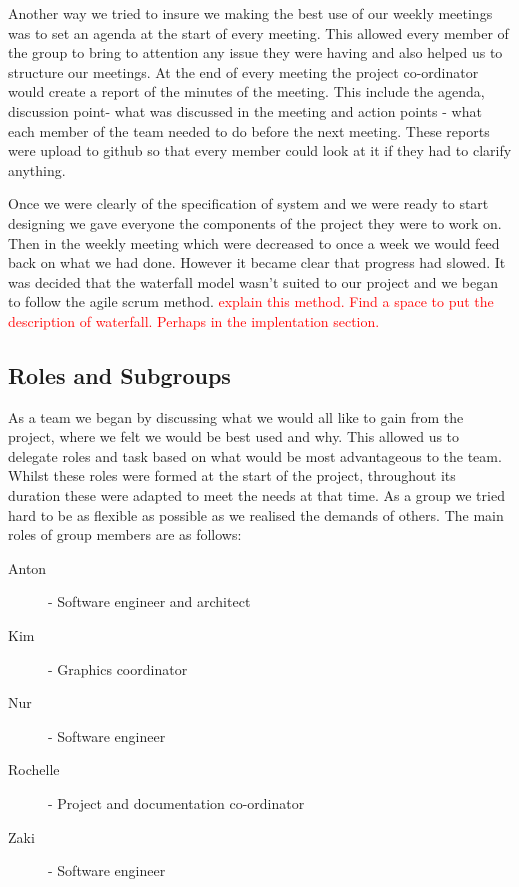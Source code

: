 \documentclass{article}
\begin{document}
 Another way we tried to insure we making the best use of our weekly meetings was to set an agenda at the start of every meeting. This allowed every member of the group to bring to attention any issue they were having and also helped us to structure our meetings. At the end of every meeting the project co-ordinator would create a report of the minutes of the meeting. This include the agenda, discussion point- what was discussed in the meeting and action points - what each member of the team needed to do before the next meeting. These reports were upload to github so that every member could look at it if they had to clarify anything.
 
 Once we were clearly of the specification of system and we were ready to start designing we gave everyone the components of the project they were to work on. Then in the weekly meeting which were decreased to once a week we would feed back on what we had done. However it became clear that progress had slowed. It was decided that the waterfall model wasn't suited to our project and we began to follow the agile scrum method. \textcolor{red}{explain this method. Find a space to put the description of waterfall. Perhaps in the implentation section.}
 
 
	\subsection{Roles and Subgroups}
	
	As a team we began by discussing what we would all like to gain from the project, where we felt we would be best used and why. This allowed us to delegate roles and task based on what would be most advantageous to the team. Whilst these roles were formed at the start of the project, throughout its duration these were adapted to meet the needs at that time. As a group we tried hard to be as flexible as possible as we realised the demands of others.
	The main roles of group members are as follows:
	
	\begin{description}
		\item [Anton] - Software engineer and architect
		\item [Kim] - Graphics coordinator
		\item [Nur] - Software engineer
		\item [Rochelle] - Project and documentation co-ordinator
		\item [Zaki] - Software engineer
	\end{description}
	
\end{document}
